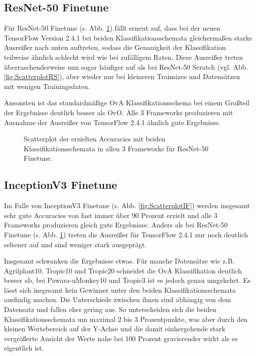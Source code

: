\subsection{ResNet-50 Finetune}
Für ResNet-50 Finetune (s. Abb. \ref{fig:ScatterplotRF}) fällt erneut auf, dass bei der neuen TensorFlow \cite{tensorflow} Version 2.4.1 bei beiden Klassifikationsschemata gleichermaßen starke Ausreißer nach unten auftreten, sodass die Genauigkeit der Klassifikation teilweise ähnlich schlecht wird wie bei zufälligem Raten. Diese Ausreißer treten überraschenderweise nun sogar häufiger auf als bei ResNet-50 Scratch (vgl. Abb. \ref{fig:ScatterplotRS}), aber wieder nur bei kleineren Trainsizes und Datensätzen mit wenigen Trainingsdaten.

Ansonsten ist das standardmäßige OvA Klassifikationsschema bei einem Großteil der Ergebnisse deutlich besser als OvO. Alle 3 Frameworks produzieren mit Ausnahme der Ausreißer von TensorFlow 2.4.1 \cite{tensorflow} ähnlich gute Ergebnisse.
\begin{figure}[H]
\hspace*{-1.5cm}

\caption{Scatterplot der erzielten Accuracies mit beiden Klassifikationsschemata in allen 3 Frameworks für ResNet-50 Finetune.}
\label{fig:ScatterplotRF}
\end{figure}
\newpage
\subsection{InceptionV3 Finetune}
Im Falle von InceptionV3 Finetune (s. Abb. \ref{fig:ScatterplotIF}) werden insgesamt sehr gute Accuracies von fast immer über 90 Prozent erzielt und alle 3 Frameworks produzieren gleich gute Ergebnisse. Anders als bei ResNet-50 Finetune (s. Abb. \ref{fig:ScatterplotRF}) treten die Ausreißer für TensorFlow 2.4.1 \cite{tensorflow} nur noch deutlich seltener auf und sind weniger stark ausgeprägt.

Insgesamt schwanken die Ergebnisse etwas. Für manche Datensätze wie z.B. Agrilplant10, Tropic10 und Tropic20 schneidet die OvA Klassifikation deutlich besser ab, bei Pawara-uMonkey10 und Tropic3 ist es jedoch genau umgekehrt.
Es lässt sich insgesamt kein Gewinner unter den beiden Klassifikationsschemata ausfindig machen. Die Unterschiede zwischen ihnen sind abhängig von dem Datensatz und fallen eher gering aus. So unterscheiden sich die beiden Klassifikationsschemata um maximal 2 bis 3 Prozentpunkte, was aber durch den kleinen Wertebereich auf der Y-Achse und die damit einhergehende stark vergrößerte Ansicht der Werte nahe bei 100 Prozent gravierender wirkt als es eigentlich ist.

